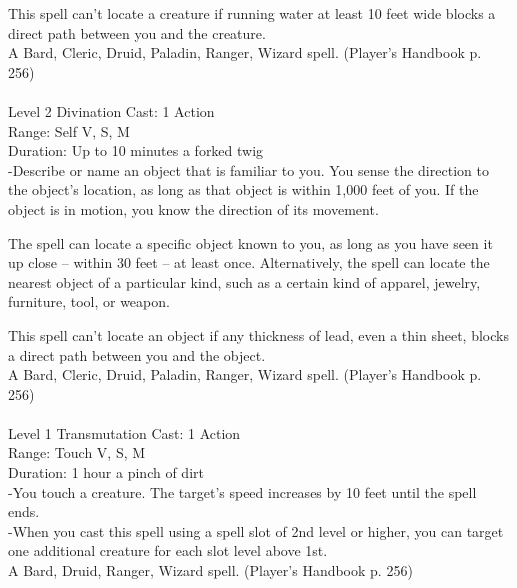 \documentclass[10pt,twocolumn]{report}
\begin{document}
This spell can’t locate a creature if running water at least 10 feet wide blocks a direct path between you and the creature.\\
A Bard, Cleric, Druid, Paladin, Ranger, Wizard spell. (Player's Handbook p. 256) \\


 \\
Level 2 \quad Divination \quad Cast: 1 Action\\
Range: Self \quad V, S, M\\
Duration: Up to 10 minutes \quad a forked twig\\
-Describe or name an object that is familiar to you. You sense the direction to the object’s location, as long as that object is within 1,000 feet of you. If the object is in motion, you know the direction of its movement.

The spell can locate a specific object known to you, as long as you have seen it up close – within 30 feet – at least once. Alternatively, the spell can locate the nearest object of a particular kind, such as a certain kind of apparel, jewelry, furniture, tool, or weapon.

This spell can’t locate an object if any thickness of lead, even a thin sheet, blocks a direct path between you and the object.\\
A Bard, Cleric, Druid, Paladin, Ranger, Wizard spell. (Player's Handbook p. 256) \\


 \\
Level 1 \quad Transmutation \quad Cast: 1 Action\\
Range: Touch \quad V, S, M\\
Duration: 1 hour \quad a pinch of dirt\\
-You touch a creature. The target’s speed increases by 10 feet until the spell ends.\\
-When you cast this spell using a spell slot of 2nd level or higher, you can target one additional creature for each slot level above 1st.\\
A Bard, Druid, Ranger, Wizard spell. (Player's Handbook p. 256) \\
\end{document}
